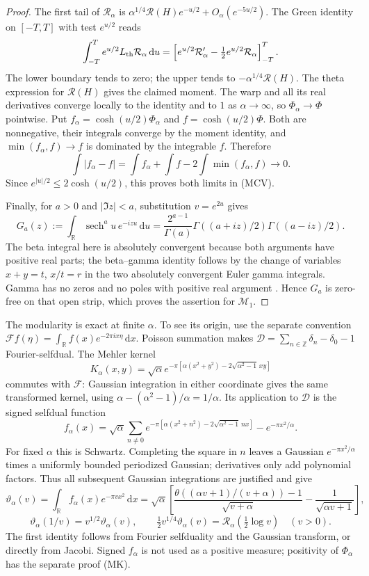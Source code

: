 \documentclass[11pt]{article}
\theoremstyle{remark}\newtheorem{remark}[theorem]{Remark}
\newcommand{\R}{\mathbb R}
\newcommand{\Z}{\mathbb Z}
\newcommand{\dd}{\,\mathrm d}
\begin{document}
\begin{proof}
The first tail of $\mathcal R_\alpha$ is
$\alpha^{1/4}\mathcal R(H)e^{-u/2}+O_\alpha(e^{-5u/2})$.
The Green identity on $[-T,T]$ with test $e^{u/2}$ reads
\[
 \int_{-T}^{T}e^{u/2}L_{\rm th}\mathcal R_\alpha\dd u
 =\left[e^{u/2}\mathcal R_\alpha'
               -\tfrac12e^{u/2}\mathcal R_\alpha\right]_{-T}^{T}.
\]
The lower boundary tends to zero; the upper tends to
$-\alpha^{1/4}\mathcal R(H)$.
The theta expression for $\mathcal R(H)$ gives the claimed moment.
The warp and all its real derivatives converge locally to the identity
and to $1$ as $\alpha\to\infty$, so $\Phi_\alpha\to\Phi$ pointwise.
Put $f_\alpha=\cosh(u/2)\Phi_\alpha$ and $f=\cosh(u/2)\Phi$.
Both are nonnegative, their integrals converge by the moment identity,
and $\min(f_\alpha,f)\to f$ is dominated by the integrable $f$.
Therefore
\[
 \int|f_\alpha-f|=\int f_\alpha+\int f-2\int\min(f_\alpha,f)
                                                     \longrightarrow0.
\]
Since $e^{|u|/2}\le2\cosh(u/2)$, this proves both limits in (MCV).

Finally, for $a>0$ and $|\Im z|<a$, substitution $v=e^{2u}$ gives
\[
 G_a(z):=\int_\R\operatorname{sech}^{a}u\,e^{-izu}\dd u
 =\frac{2^{a-1}}{\Gamma(a)}
       \Gamma((a+iz)/2)\Gamma((a-iz)/2).
\]
The beta integral here is absolutely convergent because both arguments
have positive real parts; the beta--gamma identity follows by the
change of variables $x+y=t$, $x/t=r$ in the two absolutely convergent
Euler gamma integrals. Gamma has no zeros and no poles with positive
real argument \cite[\S5.2(i)]{DLMFGamma}. Hence $G_a$ is zero-free
on that open strip, which proves the assertion for $\mathcal M_1$.
\end{proof}

The modularity is exact at finite $\alpha$. To see its origin, use the
separate convention
$\mathcal F f(\eta)=\int_\R f(x)e^{-2\pi ix\eta}\dd x$.
Poisson summation makes
$\mathcal D=\sum_{n\in\Z}\delta_n-\delta_0-1$ Fourier-selfdual.
The Mehler kernel
\[
 K_\alpha(x,y)=\sqrt\alpha
 e^{-\pi[\alpha(x^2+y^2)-2\sqrt{\alpha^2-1}\,xy]}
\]
commutes with $\mathcal F$: Gaussian integration in either coordinate
gives the same transformed kernel, using
$\alpha-(\alpha^2-1)/\alpha=1/\alpha$.
Its application to $\mathcal D$ is the signed selfdual function
\[
 f_\alpha(x)=\sqrt\alpha\sum_{n\ne0}
 e^{-\pi[\alpha(x^2+n^2)-2\sqrt{\alpha^2-1}\,nx]}
                                  -e^{-\pi x^2/\alpha}.
\]
For fixed $\alpha$ this is Schwartz. Completing the square in $n$
leaves a Gaussian $e^{-\pi x^2/\alpha}$ times a uniformly bounded
periodized Gaussian; derivatives only add polynomial factors.
Thus all subsequent Gaussian integrations are justified and give
\[
 \vartheta_\alpha(v)=\int_\R f_\alpha(x)e^{-\pi vx^2}\dd x
 =\sqrt\alpha\left[
 \frac{\theta((\alpha v+1)/(v+\alpha))-1}{\sqrt{v+\alpha}}
                           -\frac1{\sqrt{\alpha v+1}}\right],
\]
\[
 \vartheta_\alpha(1/v)=v^{1/2}\vartheta_\alpha(v),\qquad
 \tfrac12v^{1/4}\vartheta_\alpha(v)
                      =\mathcal R_\alpha(\tfrac12\log v)\quad(v>0).
\]
The first identity follows from Fourier selfduality and the Gaussian
transform, or directly from Jacobi. Signed $f_\alpha$ is not used as
a positive measure; positivity of $\Phi_\alpha$ has the separate proof
(MK).
\end{document}
